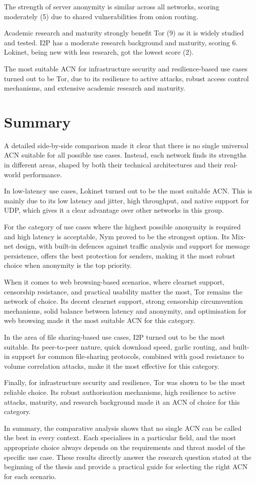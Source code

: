 The strength of server anonymity is similar across all networks, scoring moderately (5) due to shared vulnerabilities from onion routing.

Academic research and maturity strongly benefit Tor (9) as it is widely studied and tested. I2P has a moderate research background and maturity, scoring 6. Lokinet, being new with less research, got the lowest score (2).

The most suitable ACN for infrastructure security and resilience-based use cases turned out to be Tor, due to its resilience to active attacks, robust access control mechanisms, and extensive academic research and maturity.

\section{Summary}
A detailed side-by-side comparison made it clear that there is no single universal ACN suitable for all possible use cases. Instead, each network finds its strengths in different areas, shaped by both their technical architectures and their real-world performance.

In low-latency use cases, Lokinet turned out to be the most suitable ACN. This is mainly due to its low latency and jitter, high throughput, and native support for UDP, which gives it a clear advantage over other networks in this group. 

For the category of use cases where the highest possible anonymity is required and high latency is acceptable, Nym proved to be the strongest option. Its Mix-net design, with built-in defences against traffic analysis and support for message persistence, offers the best protection for senders, making it the most robust choice when anonymity is the top priority.

When it comes to web browsing-based scenarios, where clearnet support, censorship resistance, and practical usability matter the most, Tor remains the network of choice. Its decent clearnet support, strong censorship circumvention mechanisms, solid balance between latency and anonymity, and optimisation for web browsing made it the most suitable ACN for this category.

In the area of file sharing-based use cases, I2P turned out to be the most suitable. Its peer-to-peer nature, quick download speed, garlic routing, and built-in support for common file-sharing protocols, combined with good resistance to volume correlation attacks, make it the most effective for this category.

Finally, for infrastructure security and resilience, Tor was shown to be the most reliable choice. Its robust authorisation mechanisms, high resilience to active attacks, maturity, and research background made it an ACN of choice for this category.

In summary, the comparative analysis shows that no single ACN can be called the best in every context. Each specialises in a particular field, and the most appropriate choice always depends on the requirements and threat model of the specific use case. These results directly answer the research question stated at the beginning of the thesis and provide a practical guide for selecting the right ACN for each scenario.
